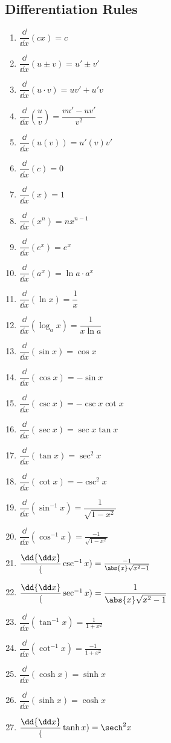 

\subsection{Differentiation Rules}

\bgroup
\footnotesize
\renewcommand{\arraystretch}{2.5}
\setlength{\columnsep}{6pt}
\noindent
\parbox{.2\linewidth}{%
\begin{enumerate}
\item $\dfrac\dd{\dd x}(cx)=c$
\item $\dfrac\dd{\dd x}(u\pm v)=u'\pm v'$
\item $\dfrac\dd{\dd x}(u\cdot v)=uv'+u'v$%
\item $\dfrac\dd{\dd x}\left(\dfrac uv\right)=\dfrac{vu'-uv'}{v^2}$
\item $\dfrac\dd{\dd x}(u(v))=u'(v)v'$
\item $\dfrac\dd{\dd x}(c)=0$
\item $\dfrac\dd{\dd x}(x)=1$
\item $\dfrac\dd{\dd x}(x^n)=nx^{n-1}$
\item $\dfrac\dd{\dd x}(e^x)=e^x$
\end{enumerate}}\hfill
\parbox{.22\linewidth}{%
\begin{enumerate}\setcounter{enumi}{9}
\item $\dfrac\dd{\dd x}(a^x)=\ln a\cdot a^x$
\item $\dfrac\dd{\dd x}(\ln x)=\dfrac1x$
\item $\dfrac\dd{\dd x}(\log_a x)=\dfrac1{x\ln a}$
\item $\dfrac\dd{\dd x}(\sin x)=\cos x$
\item $\dfrac\dd{\dd x}(\cos x)=-\sin x$
\item $\dfrac\dd{\dd x}(\csc x)=-\csc x\cot x$%
\item $\dfrac\dd{\dd x}(\sec x)=\sec x\tan x$
\item $\dfrac\dd{\dd x}(\tan x)=\sec^2x$
\item $\dfrac\dd{\dd x}(\cot x)=-\csc^2x$
\end{enumerate}}\hfill
\parbox{.24\linewidth}{%
\begin{enumerate}\setcounter{enumi}{18}
\item $\dfrac\dd{\dd x}(\sin^{-1}x)=\dfrac1{\sqrt{1-x^2}}$
\item $\dfrac\dd{\dd x}(\cos^{-1}x)=\frac{-1}{\sqrt{1-x^2}}$
\item $\dfrac\dd{\dd x}(\csc^{-1}x)=\frac{-1}{\abs{x}\sqrt{x^2-1}}$
\item $\dfrac\dd{\dd x}(\sec^{-1}x)=\dfrac1{\abs{x}\sqrt{x^2-1}}$%
\item $\dfrac\dd{\dd x}(\tan^{-1}x)=\frac1{1+x^2}$
\item $\dfrac\dd{\dd x}(\cot^{-1}x)=\frac{-1}{1+x^2}$
\item $\dfrac\dd{\dd x}(\cosh x)=\sinh x$
\item $\dfrac\dd{\dd x}(\sinh x)=\cosh x$
\item $\dfrac\dd{\dd x}(\tanh x)=\sech^2x$
\end{enumerate}}\hfill
